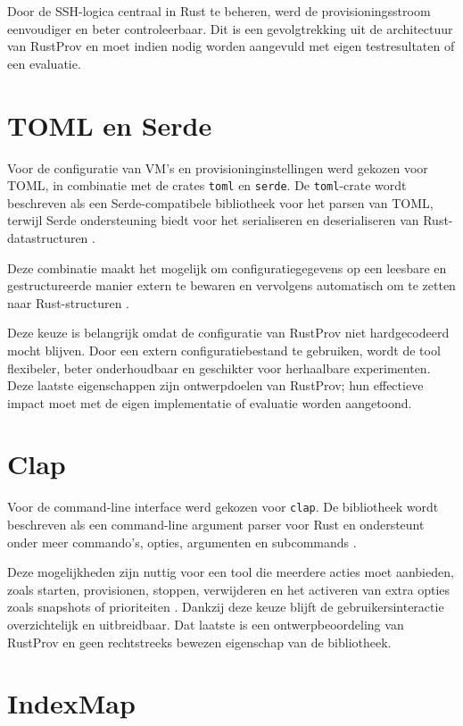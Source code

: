 Door de SSH-logica centraal in Rust te beheren, werd de provisioningsstroom eenvoudiger en beter controleerbaar. Dit is een gevolgtrekking uit de architectuur van RustProv en moet indien nodig worden aangevuld met eigen testresultaten of een evaluatie.

\section{TOML en Serde}

Voor de configuratie van VM's en provisioninginstellingen werd gekozen voor TOML, in combinatie met de crates \texttt{toml} en \texttt{serde}. De \texttt{toml}-crate wordt beschreven als een Serde-compatibele bibliotheek voor het parsen van TOML, terwijl Serde ondersteuning biedt voor het serialiseren en deserialiseren van Rust-datastructuren \autocite{TomlDocs2026,SerdeDocs2026}.

Deze combinatie maakt het mogelijk om configuratiegegevens op een leesbare en gestructureerde manier extern te bewaren en vervolgens automatisch om te zetten naar Rust-structuren \autocite{TomlDocs2026,SerdeDocs2026}.

Deze keuze is belangrijk omdat de configuratie van RustProv niet hardgecodeerd mocht blijven. Door een extern configuratiebestand te gebruiken, wordt de tool flexibeler, beter onderhoudbaar en geschikter voor herhaalbare experimenten. Deze laatste eigenschappen zijn ontwerpdoelen van RustProv; hun effectieve impact moet met de eigen implementatie of evaluatie worden aangetoond.

\section{Clap}

Voor de command-line interface werd gekozen voor \texttt{clap}. De bibliotheek wordt beschreven als een command-line argument parser voor Rust en ondersteunt onder meer commando's, opties, argumenten en subcommands \autocite{ClapDocs2026}.

Deze mogelijkheden zijn nuttig voor een tool die meerdere acties moet aanbieden, zoals starten, provisionen, stoppen, verwijderen en het activeren van extra opties zoals snapshots of prioriteiten \autocite{ClapDocs2026}. Dankzij deze keuze blijft de gebruikersinteractie overzichtelijk en uitbreidbaar. Dat laatste is een ontwerpbeoordeling van RustProv en geen rechtstreeks bewezen eigenschap van de bibliotheek.

\section{IndexMap}

